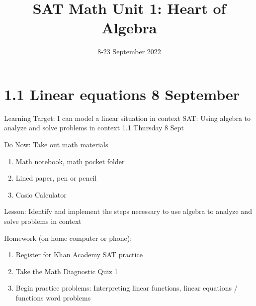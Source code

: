 

\title{SAT Math Unit 1: Heart of Algebra}
\date{8-23 September 2022}


\frame{\titlepage}

\section[Outline]{}
\frame{\tableofcontents}

\section{1.1 Linear equations \hfill 8 September}
\begin{frame}{Learning Target: I can model a linear situation in context}
  {SAT: Using algebra to analyze and solve problems in
  context \hfill \alert{1.1 Thursday 8 Sept}}
  \begin{block}{Do Now: Take out math materials}
    \begin{enumerate}
        \item Math notebook, math pocket folder
        \item Lined paper, pen or pencil
        \item Casio Calculator
    \end{enumerate}
    \end{block}
    Lesson: Identify and implement the steps necessary to use algebra to analyze and
    solve problems in context \par \medskip
    Homework (on home computer or phone): 
    \begin{enumerate}
      \item Register for Khan Academy SAT practice
      \item Take the Math Diagnostic Quiz 1
      \item Begin practice problems: Interpreting linear functions, linear equations / functions word problems
    \end{enumerate}
  \end{frame}

